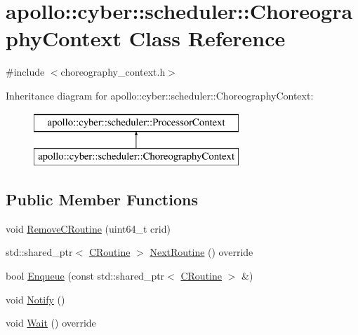 \hypertarget{classapollo_1_1cyber_1_1scheduler_1_1ChoreographyContext}{\section{apollo\-:\-:cyber\-:\-:scheduler\-:\-:Choreography\-Context Class Reference}
\label{classapollo_1_1cyber_1_1scheduler_1_1ChoreographyContext}
}


{\ttfamily \#include $<$choreography\-\_\-context.\-h$>$}

Inheritance diagram for apollo\-:\-:cyber\-:\-:scheduler\-:\-:Choreography\-Context\-:\begin{figure}[H]
\begin{center}
\leavevmode
\includegraphics[height=2.000000cm]{classapollo_1_1cyber_1_1scheduler_1_1ChoreographyContext}
\end{center}
\end{figure}
\subsection*{Public Member Functions}
\begin{DoxyCompactItemize}
\item 
void \hyperlink{classapollo_1_1cyber_1_1scheduler_1_1ChoreographyContext_ab56d352881d30f192738920ec4809e32}{Remove\-C\-Routine} (uint64\-\_\-t crid)
\item 
std\-::shared\-\_\-ptr$<$ \hyperlink{classapollo_1_1cyber_1_1croutine_1_1CRoutine}{C\-Routine} $>$ \hyperlink{classapollo_1_1cyber_1_1scheduler_1_1ChoreographyContext_aab1c6b9f912a43e1339fa99f2e3631b6}{Next\-Routine} () override
\item 
bool \hyperlink{classapollo_1_1cyber_1_1scheduler_1_1ChoreographyContext_a68bf8c57755cb932518ae9fe8b6fa196}{Enqueue} (const std\-::shared\-\_\-ptr$<$ \hyperlink{classapollo_1_1cyber_1_1croutine_1_1CRoutine}{C\-Routine} $>$ \&)
\item 
void \hyperlink{classapollo_1_1cyber_1_1scheduler_1_1ChoreographyContext_a7ee909ed845a79cdc00a649504d15174}{Notify} ()
\item 
void \hyperlink{classapollo_1_1cyber_1_1scheduler_1_1ChoreographyContext_a895fb1717d71bb0e53abfdc5f9a7a768}{Wait} () override
\end{DoxyCompactItemize}
